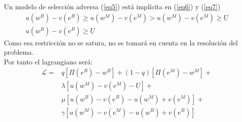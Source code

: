 \begin{frame}{Un modelo de selección adversa}
	(\ref{eq5}) está implícita  en (\ref{eq6}) y (\ref{eq7})
		\begin{gather*}
			u(w^B) - v(e^B) \geq u(w^M) - v(e^M) > u(w^M) - v(e^M) \geq \underline{U}\\
			u(w^B) - v(e^B) \geq \underline{U}
		\end{gather*}
	Como esa restricción no se satura, no se tomará en cuenta en la resolución del problema.\\[0.3cm]
	Por tanto el lagrangiano será:
		\begin{align*}
			\mathscr{L} = & q\left[ \Pi(e^B)-w^B\right] + (1-q)\left[ \Pi(e^M) - w^M\right] +\\
						  & \lambda \left[u(w^M) - v(e^M) - \underline{U} \right] +\\
						  & \mu \left[ u(w^B) - v(e^B) - u(w^M) + v(e^M)\right] +\\
						  & \gamma \left[u(w^M) - v(e^M) - u(w^B) + v(e^B) \right] 
		\end{align*}
\end{frame}